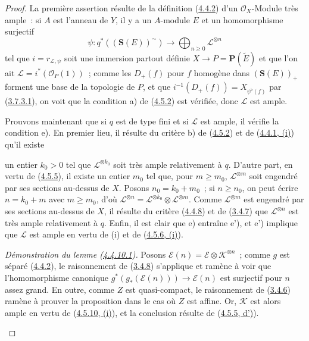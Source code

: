 \begin{proof}
La première assertion résulte de la définition
(\hyperref[II.4.4.2-fr]{4.4.2}) d'un $\mathcal{O}_X$-Module très ample~: si
$A$ est l'anneau de $Y$, il y a un $A$-module $E$ et un homomorphisme
surjectif
\[
  \psi:q^*((\mathbf{S}(E))^{\sim})\longrightarrow
  \bigoplus_{n\geq0}\mathcal{L}^{\otimes n}
\]
tel que $i=r_{\mathcal{L},\psi}$ soit une immersion partout définie
$X\to P=\mathbf{P}(\widetilde{E})$ et que l'on ait
$\mathcal{L}=i^*(\mathcal{O}_P(1))$~; comme les $D_+(f)$ pour $f$ homogène
dans $(\mathbf{S}(E))_+$ forment une base de la topologie de $P$, et que
$i^{-1}(D_+(f))=X_{\psi^\flat(f)}$ par
(\hyperref[II.3.7.3.1-fr]{3.7.3.1}), on voit que la condition a) de
(\hyperref[II.4.5.2-fr]{4.5.2}) est vérifiée, donc $\mathcal{L}$ est ample.

Prouvons maintenant que si $q$ est de type fini et si $\mathcal{L}$ est
ample, il vérifie la condition e). En premier lieu, il résulte du critère b)
de (\hyperref[II.4.5.2-fr]{4.5.2}) et de
(\hyperref[II.4.4.1-fr]{4.4.1, (i)}) qu'il existe


un entier $k_0>0$ tel que $\mathcal{L}^{\otimes k_0}$ soit très ample
relativement à $q$. D'autre part, en vertu de
(\hyperref[II.4.5.5-fr]{4.5.5}), il existe un entier $m_0$ tel que, pour
$m\geq m_0$, $\mathcal{L}^{\otimes m}$ soit engendré par ses sections
au-dessus de $X$. Posons $n_0=k_0+m_0$~; si $n\geq n_0$, on peut écrire
$n=k_0+m$ avec $m\geq m_0$, d'où
$\mathcal{L}^{\otimes n}
=\mathcal{L}^{\otimes k_0}\otimes\mathcal{L}^{\otimes m}$. Comme
$\mathcal{L}^{\otimes m}$ est engendré par ses sections au-dessus de $X$, il
résulte du critère (\hyperref[II.4.4.8-fr]{4.4.8}) et de
(\hyperref[II.3.4.7-fr]{3.4.7}) que $\mathcal{L}^{\otimes n}$ est très ample
relativement à $q$. Enfin, il est clair que e) entraîne e'), et e') implique
que $\mathcal{L}$ est ample en vertu de (i) et de
(\hyperref[II.4.5.6-fr]{4.5.6, (i)}).

\begin{env}[4.5.10.1]
\label{II.4.5.10.1-fr}
\emph{Démonstration du lemme (\hyperref[II.4.4.10.1-fr]{4.4.10.1}).} Posons
$\mathcal{E}(n)=\mathcal{E}\otimes\mathcal{K}^{\otimes n}$~; comme $g$ est
séparé (\hyperref[II.4.4.2-fr]{4.4.2}), le raisonnement de
(\hyperref[II.3.4.8-fr]{3.4.8}) s'applique et ramène à voir que
l'homomorphisme canonique
$g^*(g_*(\mathcal{E}(n)))\to\mathcal{E}(n)$ est surjectif pour $n$ assez
grand. En outre, comme $Z$ est quasi-compact, le raisonnement de
(\hyperref[II.3.4.6-fr]{3.4.6}) ramène à prouver la proposition dans le cas
où $Z$ est affine. Or, $\mathcal{K}$ est alors ample en vertu de
(\hyperref[II.4.5.10-fr]{4.5.10, (i)}), et la conclusion résulte de
(\hyperref[II.4.5.5-fr]{4.5.5, d')}).
\end{env}
\end{proof}

